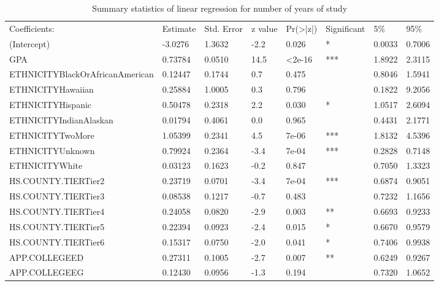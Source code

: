 \documentclass[12pt,english]{report}
\begin{document}
\begin{table}[H]
\centering
\caption{Summary statistics of linear regression for number of years of study }
\label{LR_num_years}
\begin{adjustbox}{width=0.95\textwidth}
\begin{tabular}{|llllllll|} \hline %
Coefficients:                   & Estimate & Std. Error & z value & Pr(\textgreater|z|) & Significant & 5\%    & 95\%   \\

(Intercept)                    &  -3.0276 & 1.3632  & -2.2  &  0.026 & *  &0.0033 & 0.7006 \\  
GPA                            &  0.73784 & 0.0510  & 14.5  & <2e-16 & ***&1.8922 & 2.3115 \\
ETHNICITYBlackOrAfricanAmerican&  0.12447 & 0.1744  &  0.7  &  0.475 &    &0.8046 & 1.5941 \\
ETHNICITYHawaiian              &  0.25884 & 1.0005 &   0.3  &  0.796 &    &0.1822 & 9.2056 \\
ETHNICITYHispanic              &  0.50478 & 0.2318 &   2.2  &  0.030 & *  &1.0517 & 2.6094 \\
ETHNICITYIndianAlaskan         &  0.01794 & 0.4061 &   0.0  &  0.965 &    &0.4431 & 2.1771 \\
ETHNICITYTwoMore               &  1.05399 & 0.2341 &   4.5  &  7e-06 & ***&1.8132 & 4.5396 \\
ETHNICITYUnknown               &  0.79924 & 0.2364 &  -3.4  &  7e-04 & ***&0.2828 & 0.7148 \\
ETHNICITYWhite                 &  0.03123 & 0.1623 &  -0.2  &  0.847 &    &0.7050 & 1.3323 \\
HS.COUNTY.TIERTier2            &  0.23719 & 0.0701 &  -3.4  &  7e-04 & ***&0.6874 & 0.9051 \\
HS.COUNTY.TIERTier3            &  0.08538 & 0.1217 &  -0.7  &  0.483 &    &0.7232 & 1.1656 \\
HS.COUNTY.TIERTier4            &  0.24058 & 0.0820 &  -2.9  &  0.003 & ** &0.6693 & 0.9233 \\
HS.COUNTY.TIERTier5            &  0.22394 & 0.0923 &  -2.4  &  0.015 & *  &0.6670 & 0.9579 \\
HS.COUNTY.TIERTier6            &  0.15317 & 0.0750 &  -2.0  &  0.041 & *  &0.7406 & 0.9938 \\
APP.COLLEGEED                  &  0.27311 & 0.1005 &  -2.7  &  0.007 & ** &0.6249 & 0.9267 \\
APP.COLLEGEEG                  &  0.12430 & 0.0956 &  -1.3  &  0.194 &    &0.7320 & 1.0652 \\

\end{tabular}
\end{adjustbox}
\end{table}
\end{document}
